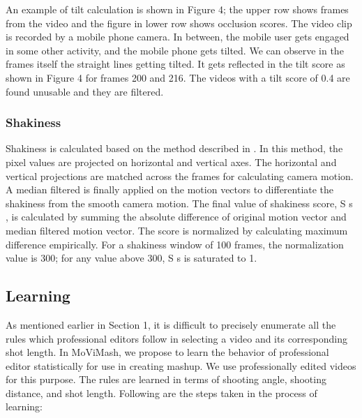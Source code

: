 \documentclass{clsfile}
\begin{document}
An example of tilt calculation is shown in Figure 4; the upper
row shows frames from the video and the figure in lower row shows
occlusion scores. The video clip is recorded by a mobile phone
camera. In between, the mobile user gets engaged in some other
activity, and the mobile phone gets tilted. We can observe in the
frames itself the straight lines getting tilted. It gets reflected in the
tilt score as shown in Figure 4 for frames 200 and 216. The videos
with a tilt score of 0.4 are found unusable and they are filtered.

\subsubsection{Shakiness}
Shakiness is calculated based on the method described in \cite{lions1971optimal}.
In this method, the pixel values are projected on horizontal and
vertical axes. The horizontal and vertical projections are matched
across the frames for calculating camera motion. A median filtered
is finally applied on the motion vectors to differentiate the shakiness from the smooth camera motion. The final value of shakiness
score, S s , is calculated by summing the absolute difference of original motion vector and median filtered motion vector. The score is
normalized by calculating maximum difference empirically. For a
shakiness window of 100 frames, the normalization value is 300;
for any value above 300, S s is saturated to 1.

\subsection{Learning}
As mentioned earlier in Section 1, it is difficult to precisely enumerate all the rules which professional editors follow in selecting
a video and its corresponding shot length. In MoViMash, we propose to learn the behavior of professional editor statistically for use
in creating mashup. We use professionally edited videos for this
purpose. The rules are learned in terms of shooting angle, shooting distance, and shot length. Following are the steps taken in the
process of learning:
\end{document}
